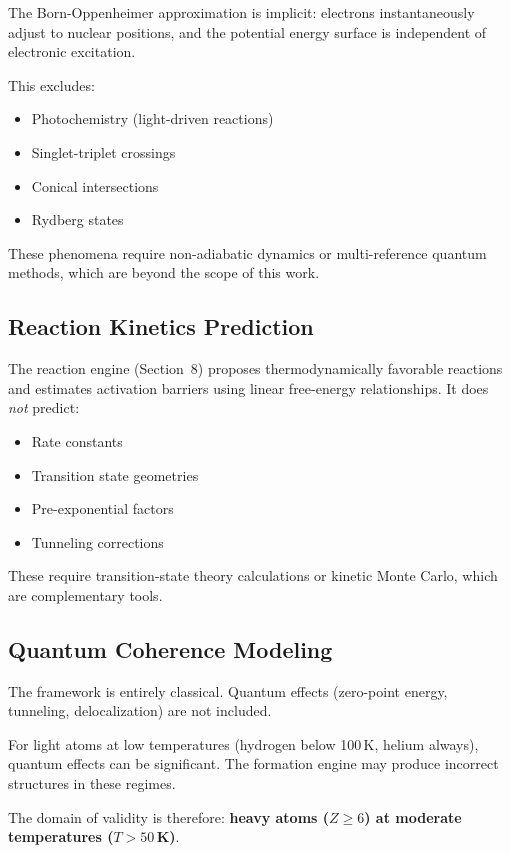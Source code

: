 \documentclass[11pt]{article}
\begin{document}
The Born-Oppenheimer approximation is implicit: electrons instantaneously adjust to nuclear positions, and the potential energy surface is independent of electronic excitation.

This excludes:
\begin{itemize}
\item Photochemistry (light-driven reactions)
\item Singlet-triplet crossings
\item Conical intersections
\item Rydberg states
\end{itemize}

These phenomena require non-adiabatic dynamics or multi-reference quantum methods, which are beyond the scope of this work.

\subsection{Reaction Kinetics Prediction}

The reaction engine (Section~8) proposes thermodynamically favorable reactions and estimates activation barriers using linear free-energy relationships. It does \textit{not} predict:

\begin{itemize}
\item Rate constants
\item Transition state geometries
\item Pre-exponential factors
\item Tunneling corrections
\end{itemize}

These require transition-state theory calculations or kinetic Monte Carlo, which are complementary tools.

\subsection{Quantum Coherence Modeling}

The framework is entirely classical. Quantum effects (zero-point energy, tunneling, delocalization) are not included.

For light atoms at low temperatures (hydrogen below 100\,K, helium always), quantum effects can be significant. The formation engine may produce incorrect structures in these regimes.

The domain of validity is therefore: \textbf{heavy atoms ($Z \geq 6$) at moderate temperatures ($T > 50$\,K)}.
\end{document}
